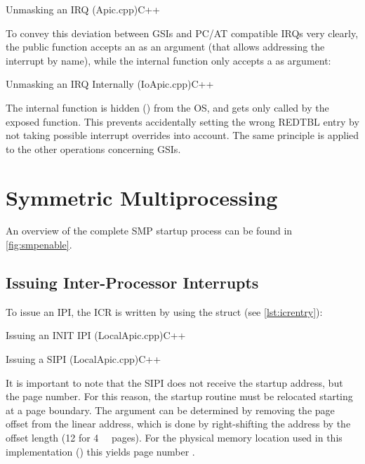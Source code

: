 \begin{codeblock}{Unmasking an IRQ (Apic.cpp)}{C++}
\end{codeblock}

To convey this deviation between GSIs and PC/AT compatible IRQs very clearly, the public  function accepts an  as an argument (that allows addressing the interrupt by name), while the internal  function only accepts a  as argument:

\begin{codeblock}{Unmasking an IRQ Internally (IoApic.cpp)}{C++}
\end{codeblock}

The internal  function is hidden () from the OS, and gets only called by the exposed  function.
This prevents accidentally setting the wrong REDTBL entry by not taking possible interrupt overrides into account.
The same principle is applied to the other operations concerning GSIs.

\section{Symmetric Multiprocessing}
\label{sec:apxsymmetric}

An overview of the complete SMP startup process can be found in \autoref{fig:smpenable}.

\subsection{Issuing Inter-Processor Interrupts}
\label{subsec:apxipis}

To issue an IPI, the ICR is written by using the  struct (see \autoref{lst:icrentry}):

\begin{codeblock}{Issuing an INIT IPI (LocalApic.cpp)}{C++}
\end{codeblock}

\begin{codeblock}{Issuing a SIPI (LocalApic.cpp)}{C++}
\end{codeblock}

It is important to note that the SIPI does not receive the startup address, but the page number.
For this reason, the startup routine must be relocated starting at a page boundary.
The  argument can be determined by removing the page offset from the linear address, which is done by right-shifting the address by the offset length (\SI{12}{\bit} for \SI{4}{\kilo\byte} pages).
For the physical memory location used in this implementation () this yields page number .

